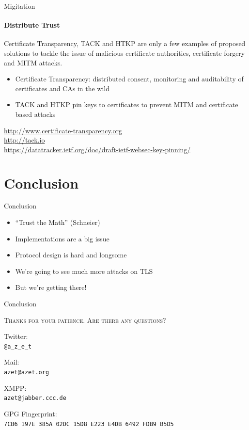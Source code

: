 \documentclass[hyperref={draft}]{beamer}
\begin{document}
\begin{frame}{Migitation}
  \framesubtitle{Distribute Trust}
  Certificate Transparency, TACK and HTKP are only a few examples of proposed solutions to tackle the issue of malicious certificate authorities, certificate forgery and MITM attacks.

  \begin{itemize}
    \item Certificate Transparency: distributed consent, monitoring and auditability of certificates and CAs in the wild
    \item TACK and HTKP pin keys to certificates to prevent MITM and certificate based attacks
  \end{itemize}

  \vspace{50px}

  \tiny
  \url{http://www.certificate-transparency.org}\\
  \url{http://tack.io}\\
  \url{https://datatracker.ietf.org/doc/draft-ietf-websec-key-pinning/}
\end{frame}

\section{Conclusion}
\begin{frame}{Conclusion}
  \begin{itemize}
    \item ``Trust the Math'' (Schneier)
    \item Implementations are a big issue
    \item Protocol design is hard and longsome
    \item We're going to see much more attacks on TLS
    \item But we're getting there!
  \end{itemize} 
\end{frame}

\begin{frame}{Conclusion}
  \begin{center}
    \textsc{Thanks for your patience. Are there any questions?}
  \end{center}
  \begin{center}
    Twitter:\\
    \texttt{@a\_z\_e\_t}
    
    
    Mail:\\
    \texttt{azet@azet.org}
    
    
    XMPP:\\
    \texttt{azet@jabber.ccc.de}
    
    
    GPG Fingerprint:\\
    \texttt{7CB6 197E 385A 02DC 15D8 E223 E4DB 6492 FDB9 B5D5}
  \end{center}
\end{frame}


\end{document}
